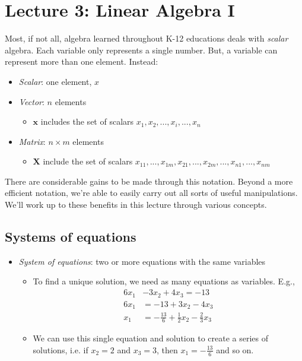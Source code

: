 \section{Lecture 3: Linear Algebra I}

Most, if not all, algebra learned throughout K-12 educations deals with \emph{scalar} algebra. Each variable only represents a single number. But, a variable can represent more than one element. Instead:

\begin{itemize}
    \item \emph{Scalar}: one element, $x$
    \item \emph{Vector}: $n$ elements
    \begin{itemize}
        \item $\bm{x}$ includes the set of scalars $x_1, x_2, ..., x_i,..., x_n$
    \end{itemize}
    \item \emph{Matrix}: $n \times m$ elements
    \begin{itemize}
        \item $\bm{X}$ include the set of scalars 
        $x_{11},..., x_{1m}, x_{21},..., x_{2m}, ..., x_{n1},..., x_{nm}$
    \end{itemize}
\end{itemize}

\noindent There are considerable gains to be made through this notation. Beyond a more efficient notation, we're able to easily carry out all sorts of useful manipulations. We'll work up to these benefits in this lecture through various concepts.

\subsection{Systems of equations}

\begin{itemize}
    \item \emph{System of equations}: two or more equations with the same variables
    \begin{itemize}
        \item To find a unique solution, we need as many equations as variables. E.g.,
        \begin{align*}
            6x_1 & - 3x_2 + 4x_3 = -13 \\
            6x_1 & = -13 + 3x_2 - 4x_3 \\
            x_1  & = -\frac{13}{6} + \frac{1}{2}x_2 - \frac{2}{3}x_3
        \end{align*} 
        \item We can use this single equation and solution to create a series of solutions, i.e. if $x_2 = 2$ and $x_3 = 3$, then $x_1 = -\frac{13}{6}$ and so on.
    \end{itemize}
\end{itemize}

